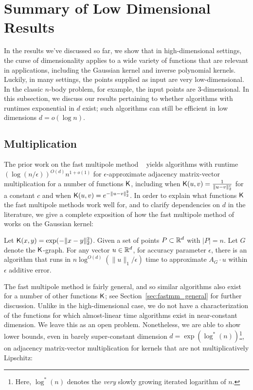 \section{Summary of Low Dimensional Results}\label{sec:low-dim-summary}

In the results we've discussed so far, we show that in high-dimensional settings, the curse of dimensionality applies to a wide variety of functions that are relevant in applications, including the Gaussian kernel and inverse polynomial kernels. Luckily, in many settings, the points supplied as input are very low-dimensional. In the classic $n$-body problem, for example, the input points are 3-dimensional. In this subsection, we discuss our results pertaining to whether algorithms with runtimes exponential in $d$ exist; such algorithms can still be efficient in low dimensions $d = o(\log n)$.

\subsection{Multiplication}

The prior work on the fast multipole method ~\cite{gr87, gr88, gr89} yields algorithms with runtime $(\log(n/\epsilon))^{O(d)} n^{1+o(1)}$ for $\epsilon$-approximate adjacency matrix-vector multiplication for a number of functions $\mathsf{K}$, including when $\mathsf{K}(u,v) = \frac{1}{\|u - v\|_2^c}$ for a constant $c$ and when $\mathsf{K}(u,v) = e^{-\|u-v\|_2^2}$. In order to explain what functions $\mathsf{K}$ the fast multipole methods work well for, and to clarify dependencies on $d$ in the literature, we give a complete exposition of how the fast multipole method of~\cite{gs91} works on the Gaussian kernel:

\begin{theorem}\label{thm:fast_gaussian_transform_intro}
Let $\mathsf{K}(x,y) = \exp (- \| x - y \|_2^2)$. Given a set of points $P \subset {\mathbb R}^d$ with $|P|= n$. Let $G$ denote the $\mathsf{K}$-graph. For any vector $u \in {\mathbb R}^d$, for accuracy parameter $\epsilon$, 
there is an algorithm that runs in 
$
n \log^{O(d)} ( \| u \|_1 / \epsilon ) 
$
time to approximate $A_G \cdot u$ within $\epsilon$ additive error.
\end{theorem}

The fast multipole method is fairly general, and so similar algorithms also exist for a number of other functions $\mathsf{K}$; see Section~\ref{sec:fastmm_general} for further discussion. 
Unlike in the high-dimensional case, we do not have a characterization of the functions for which almost-linear time algorithms exist in near-constant dimension. We leave this as an open problem. Nonetheless, we are able to show lower bounds, even in barely super-constant dimension $d = \exp(\log^*(n))$\footnote{Here, $\log^*(n)$ denotes the \emph{very} slowly growing iterated logarithm of $n$.}, on adjacency matrix-vector multiplication for kernels that are not multiplicatively Lipschitz:

